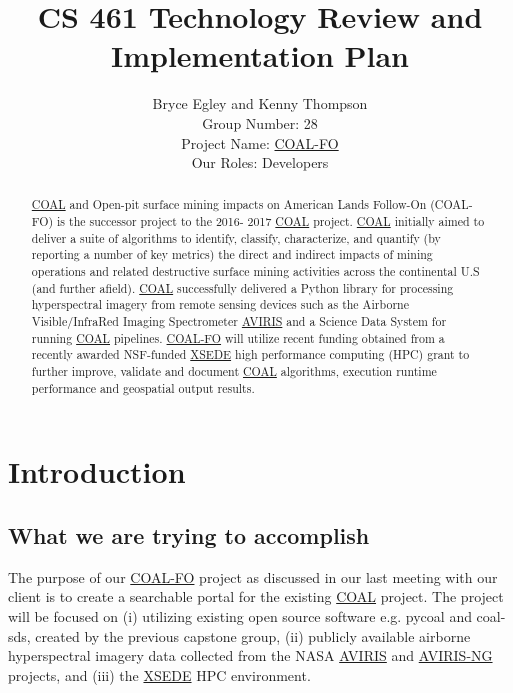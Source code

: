 \documentclass[10pt,draftclsnofoot,onecolumn,journal,compsoc]{IEEEtran}
\title{CS 461 Technology Review and Implementation Plan}
\author{Bryce Egley and Kenny Thompson \\ Group Number: 28 \\ Project Name: \href{http://eecs.oregonstate.edu/capstone/submission/?page=preview\&pid=320}{COAL-FO} \\ Our Roles: Developers}
\date{}
\begin{document}
\maketitle
  \begin{abstract}
	\href{https://capstone-coal.github.io/}{COAL} and Open-pit surface mining impacts on American Lands Follow-On (COAL-FO) is the successor project to the 2016-
2017 \href{https://capstone-coal.github.io/}{COAL} project. \href{https://capstone-coal.github.io/}{COAL} initially aimed to deliver a suite of algorithms to identify, classify, characterize, and quantify (by reporting a
number of key metrics) the direct and indirect impacts of mining operations and related destructive surface mining activities across the
continental U.S (and further afield). \href{https://capstone-coal.github.io/}{COAL} successfully delivered a Python library for processing hyperspectral imagery from remote
sensing devices such as the Airborne Visible/InfraRed Imaging Spectrometer \href{https://aviris.jpl.nasa.gov/}{AVIRIS} and a Science Data System for running \href{https://capstone-coal.github.io/}{COAL}
pipelines. \href{http://eecs.oregonstate.edu/capstone/cs/capstone.cgi?project=320}{COAL-FO} will utilize recent funding obtained from a recently awarded NSF-funded \href{https://www.xsede.org/}{XSEDE} high performance computing
(HPC) grant to further improve, validate and document \href{https://capstone-coal.github.io/}{COAL} algorithms, execution runtime performance and geospatial output
results.\cite{1}
  \end{abstract}
\newpage

\newpage

\section{Introduction}

\subsection{What we are trying to accomplish}

\noindent The purpose of our \href{http://eecs.oregonstate.edu/capstone/cs/capstone.cgi?project=320}{COAL-FO} project as discussed in our last meeting with our client is to create a searchable portal for the existing \href{https://capstone-coal.github.io/}{COAL} project. The project will be focused on (i) utilizing existing open source software e.g. pycoal and coal-sds, created by the previous capstone group, (ii) publicly available airborne hyperspectral imagery data collected from the NASA \href{https://aviris.jpl.nasa.gov/}{AVIRIS} and \href{https://aviris-ng.jpl.nasa.gov/}{AVIRIS-NG} projects, and (iii) the \href{https://www.xsede.org/}{XSEDE} HPC environment.\newline
\end{document}
